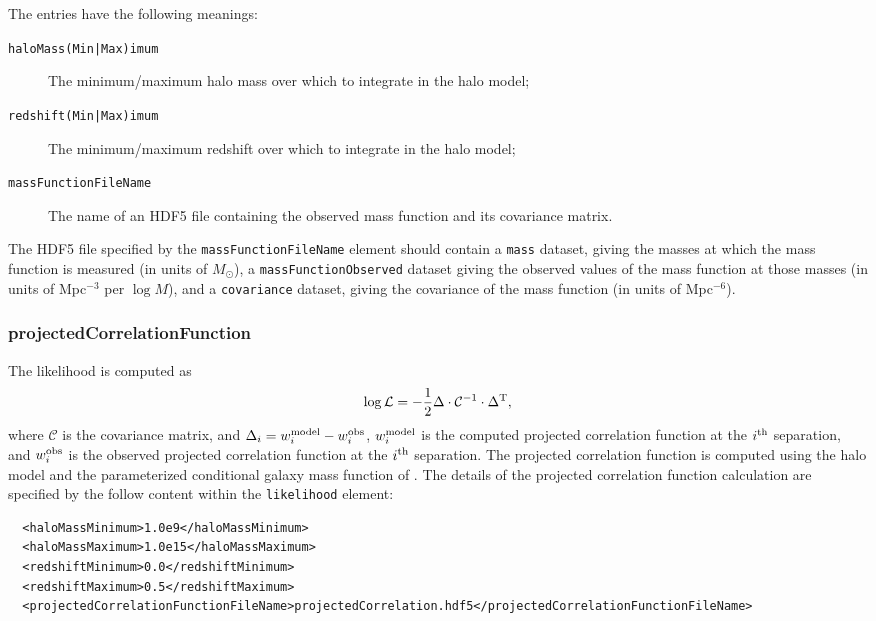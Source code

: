 The entries have the following meanings:
\begin{description}
\item[{\tt haloMass(Min|Max)imum}] The minimum/maximum halo mass over which to integrate in the halo model;
\item[{\tt redshift(Min|Max)imum}] The minimum/maximum redshift over which to integrate in the halo model;
\item[{\tt massFunctionFileName}] The name of an HDF5 file containing the observed mass function and its covariance matrix.
\end{description}

The HDF5 file specified by the {\tt massFunctionFileName} element should contain a {\tt mass} dataset, giving the masses at which the mass function is measured (in units of $M_\odot$), a {\tt massFunctionObserved} dataset giving the observed values of the mass function at those masses (in units of Mpc$^{-3}$ per $\log M$), and a {\tt covariance} dataset, giving the covariance of the mass function (in units of Mpc$^{-6}$).

\subsubsection{projectedCorrelationFunction}

The likelihood is computed as
\begin{equation}
\log \mathcal{L} = -{1\over2} \Delta \cdot \mathcal{C}^{-1} \cdot \Delta^{\rm T},
\end{equation}
where $\mathcal{C}$ is the covariance matrix, and $\Delta_i = w_i^{\rm model} - w_i^{\rm obs}$, $w_i^{\rm model}$ is the computed projected correlation function at the $i^{\rm th}$ separation, and $w_i^{\rm obs}$ is the observed projected correlation function at the $i^{\rm th}$ separation. The projected correlation function is computed using the halo model and the parameterized conditional galaxy mass function of \cite[][see also \protect\cite{leauthaud_new_2011}; \S\protect\ref{phys:conditionalMassFunction:conditionalMassFunctionBehroozi2010}]{behroozi_comprehensive_2010}. The details of the projected correlation function calculation are specified by the follow content within the {\tt likelihood} element:
\begin{verbatim}
  <haloMassMinimum>1.0e9</haloMassMinimum>
  <haloMassMaximum>1.0e15</haloMassMaximum>
  <redshiftMinimum>0.0</redshiftMinimum>
  <redshiftMaximum>0.5</redshiftMaximum>
  <projectedCorrelationFunctionFileName>projectedCorrelation.hdf5</projectedCorrelationFunctionFileName>
\end{verbatim}

